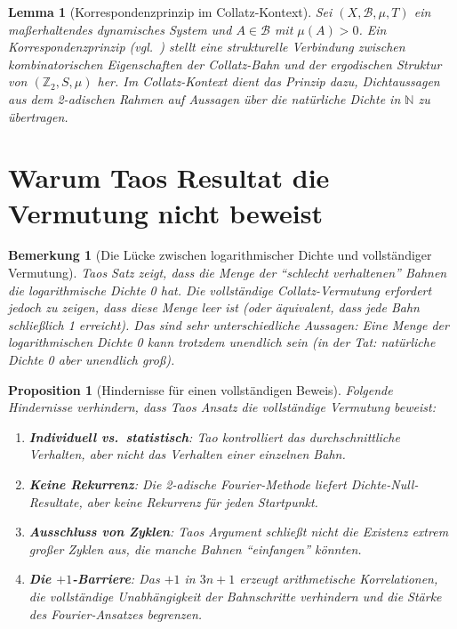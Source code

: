\documentclass[12pt,a4paper]{article}
\newtheorem{lemma}[theorem]{Lemma}
\newtheorem{proposition}[theorem]{Proposition}
\newtheorem{remark}[theorem]{Bemerkung}
\begin{document}
\begin{lemma}[Korrespondenzprinzip im Collatz-Kontext]\label{lem:furstenberg}
Sei $(X, \mathcal{B}, \mu, T)$ ein maßerhaltendes dynamisches System und $A \in \mathcal{B}$
mit $\mu(A) > 0$. Ein Korrespondenzprinzip (vgl.~\cite{Tao2022}) stellt eine
strukturelle Verbindung zwischen kombinatorischen Eigenschaften der Collatz-Bahn und der
ergodischen Struktur von $(\mathbb{Z}_2, S, \mu)$ her.
Im Collatz-Kontext dient das Prinzip dazu, Dichtaussagen aus dem 2-adischen Rahmen auf
Aussagen über die natürliche Dichte in $\mathbb{N}$ zu übertragen.
\end{lemma}

\section{Warum Taos Resultat die Vermutung nicht beweist}

\begin{remark}[Die Lücke zwischen logarithmischer Dichte und vollständiger Vermutung]\label{rem:luecke}
Taos Satz zeigt, dass die Menge der ``schlecht verhaltenen'' Bahnen die logarithmische
Dichte 0 hat. Die vollständige Collatz-Vermutung erfordert jedoch zu zeigen, dass diese
Menge \emph{leer} ist (oder äquivalent, dass jede Bahn schließlich 1 erreicht). Das sind
sehr unterschiedliche Aussagen: Eine Menge der logarithmischen Dichte 0 kann trotzdem
unendlich sein (in der Tat: natürliche Dichte 0 aber unendlich groß).
\end{remark}

\begin{proposition}[Hindernisse für einen vollständigen Beweis]\label{prop:hindernisse}
Folgende Hindernisse verhindern, dass Taos Ansatz die vollständige Vermutung beweist:
\begin{enumerate}
  \item \textbf{Individuell vs.\ statistisch}: Tao kontrolliert das durchschnittliche
        Verhalten, aber nicht das Verhalten einer einzelnen Bahn.
  \item \textbf{Keine Rekurrenz}: Die 2-adische Fourier-Methode liefert Dichte-Null-Resultate,
        aber keine Rekurrenz für jeden Startpunkt.
  \item \textbf{Ausschluss von Zyklen}: Taos Argument schließt nicht die Existenz
        extrem großer Zyklen aus, die manche Bahnen ``einfangen'' könnten.
  \item \textbf{Die $+1$-Barriere}: Das $+1$ in $3n+1$ erzeugt arithmetische Korrelationen,
        die vollständige Unabhängigkeit der Bahnschritte verhindern und die Stärke des
        Fourier-Ansatzes begrenzen.
\end{enumerate}
\end{proposition}
\end{document}

